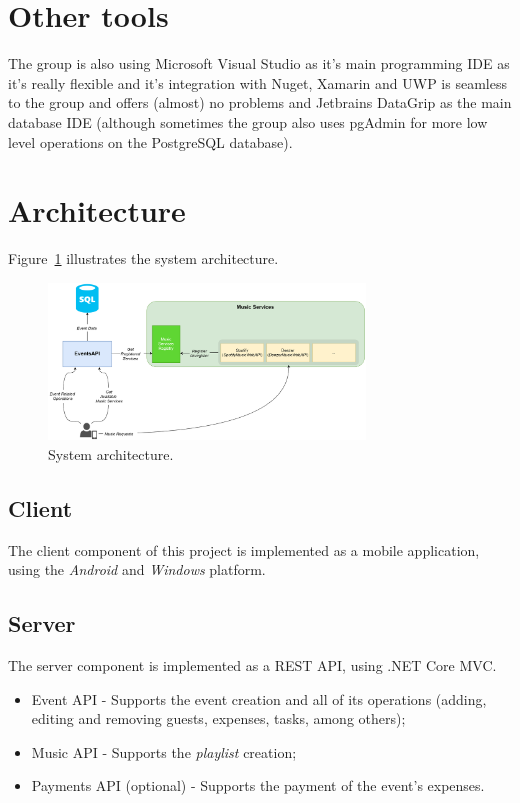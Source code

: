 \newpage

\section{Other tools}
The group is also using Microsoft Visual Studio as it's main programming IDE as it's really flexible and it's integration with Nuget, Xamarin and UWP is seamless to the group and offers (almost) no problems and Jetbrains DataGrip as the main database IDE (although sometimes the group also uses pgAdmin for more low level operations on the PostgreSQL database).



\section{Architecture}

Figure~\ref{fig:SystemArchitecture} illustrates the system architecture.

\begin{figure}[!ht]
	\centering
	\includegraphics[width=0.75\textwidth]{./Chapter4/Figures/Architecture.png}
	\caption{System architecture.}
	\label{fig:SystemArchitecture}
\end{figure}

\subsection{Client}

The client component of this project is implemented as a mobile application, using the \textit{Android} and \textit{Windows} platform.

\subsection{Server}

The server component is implemented as a REST API, using .NET Core MVC.
\begin{itemize}	
	\item Event API - Supports the event creation and all of its operations (adding, editing and removing guests, expenses, tasks, among others);
	
	\item Music API - Supports the \textit{playlist} creation;
	
	\item Payments API (optional) - Supports the payment of the event's expenses.
	
\end{itemize}

